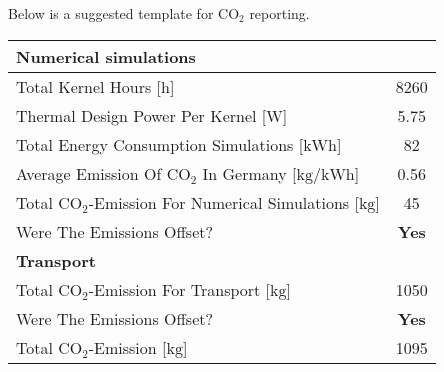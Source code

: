 \documentclass[]{article}
\begin{document}
Below is a suggested template for CO$_2$ reporting. 

\begin{center}
\begin{tabular}[b]{l c}
\hline
\textbf{Numerical simulations} & \\
\hline
Total Kernel Hours [$\mathrm{h}$]& 8260\\
Thermal Design Power Per Kernel [$\mathrm{W}$]& 5.75\\
Total Energy Consumption Simulations [$\mathrm{kWh}$] & 82\\
Average Emission Of CO$_2$ In Germany [$\mathrm{kg/kWh}$]& 0.56\\
Total CO$_2$-Emission For Numerical Simulations [$\mathrm{kg}$] & 45\\
Were The Emissions Offset? & \textbf{Yes}\\
\hline
\textbf{Transport} & \\
\hline
Total CO$_2$-Emission For Transport [$\mathrm{kg}$] & 1050\\
Were The Emissions Offset? & \textbf{Yes}\\
\hline
Total CO$_2$-Emission [$\mathrm{kg}$] & 1095\\
\hline
\hline
\end{tabular}
\end{center}
\end{document}
